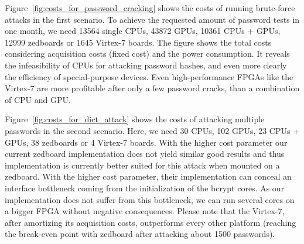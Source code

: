 Figure~\ref{fig:costs_for_password_cracking} shows the costs of running
brute-force attacks in the first scenario. To achieve the requested amount of
password tests in one month, we need 13564 single CPUs, 43872 GPUs,
10361 CPUs + GPUs, 12999 zedboards or 1645 Virtex-7 boards. The figure
shows the total costs considering acquisition costs (fixed cost) and the power
consumption. It reveals the infeasibility of CPUs for attacking password hashes,
and even more clearly the efficiency of special-purpose devices. Even
high-performance FPGAs like the Virtex-7 are more profitable after only a few
password cracks, than a combination of CPU and GPU.

Figure~\ref{fig:costs_for_dict_attack} shows the costs of attacking multiple
passwords in the second scenario. Here, we need 30 CPUs, 102 GPUs, 23
CPUs + GPUs, 38 zedboards or 4 Virtex-7 boards.
With the higher cost parameter our current zedboard implementation does not yield
similar good results and thus \cite{WOOT/Malvoni14} implementation is currently
better suited for this attack when mounted on a zedboard. With the higher cost
parameter, their implementation can conceal an interface bottleneck coming from
the initialization of the bcrypt cores. As our implementation does not suffer from
this bottleneck, we can run several cores on a bigger FPGA without negative
consequences. Please note that the Virtex-7, after amortizing its acquisition costs,
outperforms every other platform (reaching the break-even point with
\cite{WOOT/Malvoni14} zedboard after attacking about 1500 passwords).

